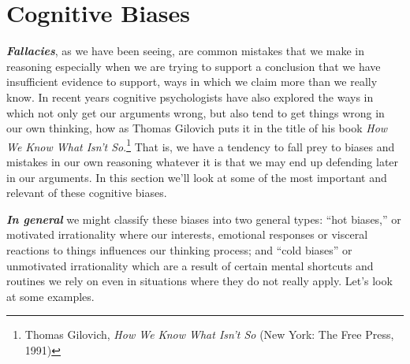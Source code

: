 \documentclass[
  12pt, openany]{book}
\begin{document}
\hypertarget{cognitive-biases}{%
\section{Cognitive Biases}\label{cognitive-biases}}

\textbf{\emph{Fallacies}}, as we have been seeing, are common mistakes that we make in reasoning especially when we are trying to support a conclusion that we have insufficient evidence to support, ways in which we claim more than we really know. In recent years cognitive psychologists have also explored the ways in which not only get our arguments wrong, but also tend to get things wrong in our own thinking, how as Thomas Gilovich puts it in the title of his book \emph{How We Know What Isn't So}.\footnote{Thomas Gilovich, \emph{How We Know What Isn't So} (New York: The Free Press, 1991)} That is, we have a tendency to fall prey to biases and mistakes in our own reasoning whatever it is that we may end up defending later in our arguments. In this section we'll look at some of the most important and relevant of these cognitive biases.

\textbf{\emph{In general}} we might classify these biases into two general types: ``hot biases,'' or motivated irrationality where our interests, emotional responses or visceral reactions to things influences our thinking process; and ``cold biases'' or unmotivated irrationality which are a result of certain mental shortcuts and routines we rely on even in situations where they do not really apply. Let's look at some examples.
\end{document}
